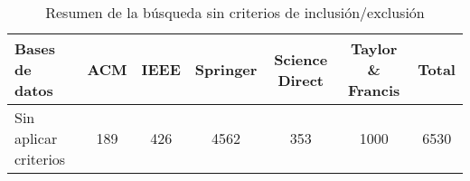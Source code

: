 \begin{table}[H]
\centering
\scriptsize
\setlength{\tabcolsep}{4pt}
\renewcommand{\arraystretch}{1.1}
\begin{tabular}{|l|c|c|c|c|c|c|}
\hline
\textbf{Bases de datos} & \textbf{ACM} & \textbf{IEEE} & \textbf{Springer} & \textbf{Science Direct} & \textbf{Taylor \& Francis} & \textbf{Total} \\
\hline
Sin aplicar criterios & 189 & 426 & 4562 & 353 & 1000 & 6530 \\
\hline
\end{tabular}
\caption{Resumen de la búsqueda sin criterios de inclusión/exclusión}
\label{tab:bases-sin-criterio}
\end{table}